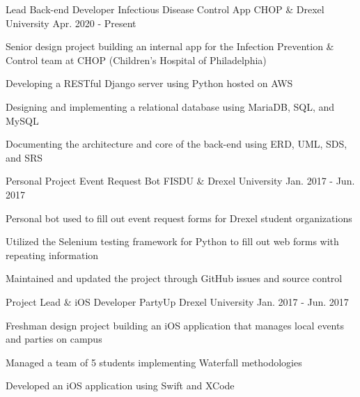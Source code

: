 

\begin{cventries}

  \cventry
    {Lead Back-end Developer} %
    {Infectious Disease Control App} %
    {CHOP \& Drexel University} %
    {Apr. 2020 - Present} %
    {
      \begin{cvitems} %
        \item Senior design project building an internal app for the Infection Prevention \& Control team at CHOP (Children's Hospital of Philadelphia)
        \item Developing a RESTful Django server using Python hosted on AWS
        \item Designing and implementing a relational database using MariaDB, SQL, and MySQL
        \item Documenting the architecture and core of the back-end using ERD, UML, SDS, and SRS
      \end{cvitems}
    }

  \cventry
    {Personal Project} %
    {Event Request Bot} %
    {FISDU \& Drexel University} %
    {Jan. 2017 - Jun. 2017} %
    {
      \begin{cvitems} %
        \item Personal bot used to fill out event request forms for Drexel student organizations
        \item Utilized the Selenium testing framework for Python to fill out web forms with repeating information
        \item Maintained and updated the project through GitHub issues and source control
      \end{cvitems}
    }

  \cventry
    {Project Lead \& iOS Developer} %
    {PartyUp} %
    {Drexel University} %
    {Jan. 2017 - Jun. 2017} %
    {
      \begin{cvitems} %
        \item Freshman design project building an iOS application that manages local events and parties on campus
        \item Managed a team of 5 students implementing Waterfall methodologies
        \item Developed an iOS application using Swift and XCode
      \end{cvitems}
    }

\end{cventries}